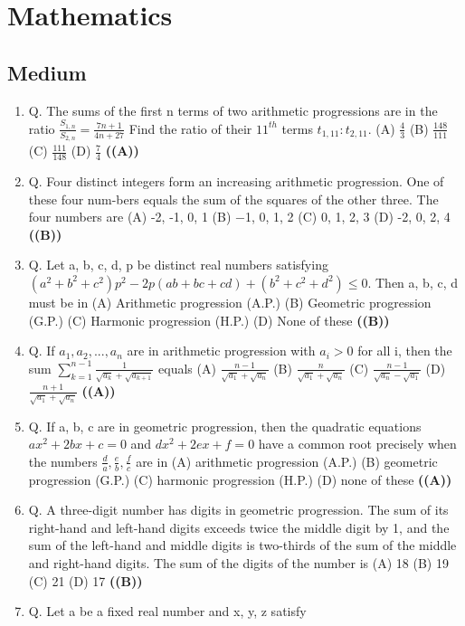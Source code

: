 \documentclass{article}
\begin{document}
\section{Mathematics}
\subsection{Medium}
\begin{enumerate}
\item Q. The sums of the first n terms of two arithmetic progressions are in the ratio
$\frac{S_{1,n}}{S_{2,n}} = \frac{7n+1}{4n+27}$
Find the ratio of their $11^{th}$ terms $t_{1,11} : t_{2,11}$.
(A) $\frac{4}{3}$
(B) $\frac{148}{111}$
(C) $\frac{111}{148}$
(D) $\frac{7}{4}$ \hfill \textbf{((A))}
\item Q. Four distinct integers form an increasing arithmetic progression. One of these four num-bers equals the sum of the squares of the other three. The four numbers are
(A) -2, -1, 0, 1
(B) −1, 0, 1, 2
(C) 0, 1, 2, 3
(D) -2, 0, 2, 4 \hfill \textbf{((B))}
\item Q. Let a, b, c, d, p be distinct real numbers satisfying
$(a^2 + b^2 + c^2)p^2 - 2p (ab+bc+cd) + (b^2+c^2 + d^2) \le 0$.
Then a, b, c, d must be in
(A) Arithmetic progression (A.P.)
(B) Geometric progression (G.P.)
(C) Harmonic progression (H.P.)
(D) None of these \hfill \textbf{((B))}
\item Q. If $a_1, a_2, ..., a_n$ are in arithmetic progression with $a_i > 0$ for all i, then the sum
$\sum_{k=1}^{n-1} \frac{1}{\sqrt{a_k} + \sqrt{a_{k+1}}}$
equals
(A) $\frac{n-1}{\sqrt{a_1}+\sqrt{a_n}}$
(B) $\frac{n}{\sqrt{a_1}+\sqrt{a_n}}$
(C) $\frac{n-1}{\sqrt{a_n} - \sqrt{a_1}}$
(D) $\frac{n+1}{\sqrt{a_1} + \sqrt{a_n}}$ \hfill \textbf{((A))}
\item Q. If a, b, c are in geometric progression, then the quadratic equations
$ax^2 + 2bx + c = 0$ and $dx^2 + 2ex + f = 0$
have a common root precisely when the numbers $\frac{d}{a}, \frac{e}{b}, \frac{f}{c}$ are in
(A) arithmetic progression (A.P.)
(B) geometric progression (G.P.)
(C) harmonic progression (H.P.)
(D) none of these \hfill \textbf{((A))}
\item Q. A three-digit number has digits in geometric progression. The sum of its right-hand and left-hand digits exceeds twice the middle digit by 1, and the sum of the left-hand and middle digits is two-thirds of the sum of the middle and right-hand digits. The sum of the digits of the number is
(A) 18
(B) 19
(C) 21
(D) 17 \hfill \textbf{((B))}
\item Q. Let a be a fixed real number and x, y, z satisfy

\end{enumerate}
\end{document}
